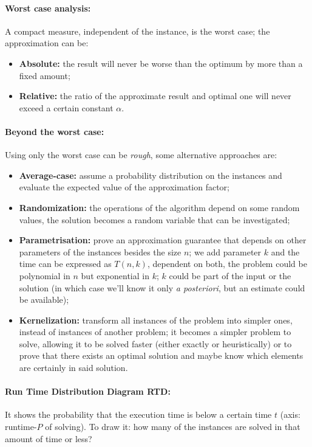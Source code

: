 \documentclass{article}
\begin{document}
	\paragraph{Worst case analysis:} A compact measure, independent of the instance, is the worst case; the approximation can be: 
	\begin{itemize}
		\item \textbf{Absolute:} the result will never be worse than the optimum by more than a fixed amount;
		\item\textbf{Relative:} the ratio of the approximate result and optimal one will never exceed a certain constant $\alpha$.\\
	\end{itemize}
	
	\paragraph{Beyond the worst case:} Using only the worst case can be \textit{rough}, some alternative approaches are: 
	\begin{itemize}
		\item \textbf{Average-case:} assume a probability distribution on the instances and evaluate the expected value of the approximation factor;
		\item \textbf{Randomization:} the operations of the algorithm depend on some random values, the solution becomes a random variable that can be investigated;
		\item \textbf{Parametrisation:} prove an approximation guarantee that depends on other parameters of the instances besides the size $n$; we add parameter $k$ and the time can be expressed as $T(n,k)$, dependent on both, the problem could be polynomial in $n$ but exponential in $k$; $k$ could be part of the input or the solution (in which case we'll know it only \textit{a posteriori}, but an estimate could be available); 
		\item \textbf{Kernelization:} transform all instances of the problem into simpler ones, instead of instances of another problem; it becomes a simpler problem to solve, allowing it to be solved faster (either exactly or heuristically) or to prove that there exists an optimal solution  and maybe know which elements are certainly in said solution.\\
	\end{itemize}
	
	\paragraph{Run Time Distribution Diagram RTD:} It shows the probability that the execution time is below a certain time $t$ (axis: runtime-$P$ of solving). To draw it: how many of the instances are solved in that amount of time or less?\\
	
\end{document}
